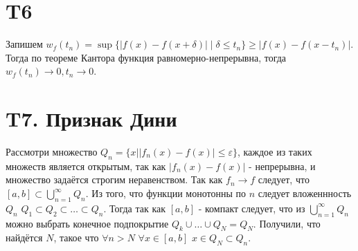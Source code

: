 \documentclass[12pt]{article}
\begin{document}
\section{T6}
Запишем $w_f(t_n) = \sup \{\vert f(x) - f(x + \delta ) \vert \mid \delta \leq  t_n\} \geq \vert f(x) - f(x - t_n) \vert $. 
Тогда по теореме Кантора функция равномерно-непрерывна, тогда $w_f(t_n) \to 0, t_n \to 0$.   
\section{T7. Признак Дини}
Рассмотри множество $Q_n = \{x \mid \vert f_n(x) - f(x) \vert \leq \varepsilon\}$, 
каждое из таких множеств является открытым, так как $\vert f_n(x) - f(x) \vert$ - непрерывна, и 
множество задаётся строгим неравенством. Так как $f_n \to f$ следует, что $[a, b] \subset \bigcup_{n=1}^{\infty} Q_n$. 
Из того, что функции монотонны по $n$ следует вложеннность $Q_n$ $Q_1 \subset Q_2 \subset \dots \subset Q_n$.
Тогда так как $[a, b]$ - компакт следует, что из $\bigcup_{n=1}^{\infty} Q_n$ можно выбрать конечное подпокрытие 
$Q_k \cup \dots \cup Q_N = Q_N$. Получили, что найдётся $N$, такое что $\forall n > N$ $\forall x \in [a, b]$ $x \in Q_N \subset Q_n$.              
\end{document}
